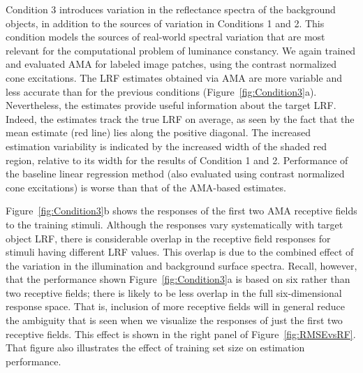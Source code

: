 \documentclass{jov}
\begin{document}
Condition 3 introduces variation in the reflectance spectra of the background objects, in addition to the sources of variation in Conditions 1 and 2.
This condition models the sources of real-world spectral variation that are most relevant for the computational problem of luminance constancy.
We again trained and evaluated AMA for labeled image patches, using the contrast normalized cone excitations.
The LRF estimates obtained via AMA are more variable and less accurate than for the previous conditions (Figure~\ref{fig:Condition3}a).
Nevertheless, the estimates provide useful information about the target LRF.
Indeed, the estimates track the true LRF on average, as seen by the fact that the mean estimate (red line) lies along the positive diagonal.
The increased estimation variability is indicated by the increased width of the shaded red region, relative to its width for the results of Condition 1 and 2.
Performance of the baseline linear regression method (also evaluated using contrast normalized cone excitations) is worse than that of the AMA-based estimates.

Figure~\ref{fig:Condition3}b shows the responses of the first two AMA receptive fields to the training stimuli.
Although the responses vary systematically with target object LRF, there is considerable overlap in the receptive field responses for stimuli having different LRF values.
This overlap is due to the combined effect of the variation in the illumination and background surface spectra.
Recall, however, that the performance shown Figure~\ref{fig:Condition3}a is based on six rather than two receptive fields;
there is likely to be less overlap in the full six-dimensional response space.
That is, inclusion of more receptive fields will in general reduce the ambiguity that is seen when we visualize the responses of just the first two receptive fields.
This effect is shown in the right panel of Figure~\ref{fig:RMSEvsRF}.
That figure also illustrates the effect of training set size on estimation performance. 
\end{document}
